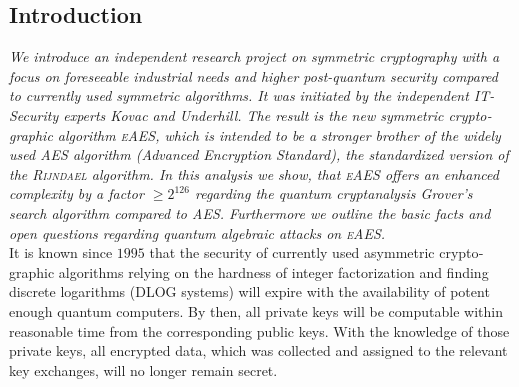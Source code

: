 \documentclass[a4paper,11pt]{article}
\begin{document}
\begin{otherlanguage}{english}

\vspace{3mm}



\section{Introduction}

\noindent
\textit{We introduce an independent research project on symmetric cryptography with a focus on foreseeable industrial needs and higher post-quantum security compared to currently used symmetric algorithms. It was initiated by the independent IT-Security experts Kovac and Underhill. The result is the new symmetric cryptographic algorithm \textsc{eAES}, which is intended to be a stronger brother of the widely used \textsc{AES} algorithm (Advanced Encryption Standard), the standardized version of the \textsc{Rijndael} algorithm. In this analysis we show, that \textsc{eAES} offers an enhanced complexity by a factor $\geq 2^{126}$ regarding the quantum cryptanalysis Grover's search algorithm compared to \textsc{AES}. Furthermore we outline the basic facts and open questions regarding quantum algebraic attacks on \textsc{eAES}.} \\

\noindent
It is known since $1995$ that the security of currently used asymmetric cryptographic algorithms relying on the hardness of integer factorization and finding discrete logarithms (DLOG systems) will expire with the availability of potent enough quantum computers. By then, all private keys will be computable within reasonable time from the corresponding public keys. With the knowledge of those private keys, all encrypted data, which was collected and assigned to the relevant key exchanges, will no longer remain secret. \\


\end{otherlanguage}
\end{document}
